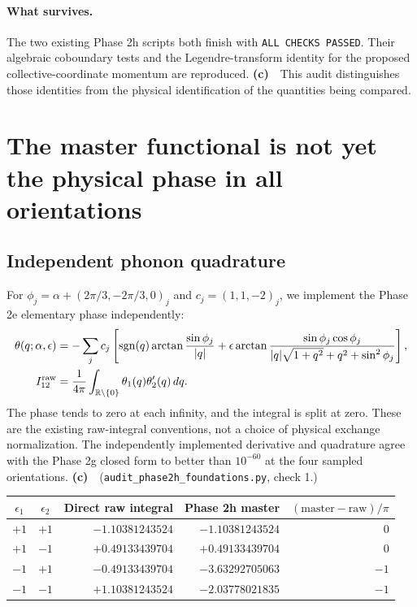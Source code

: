 \documentclass[11pt,a4paper]{article}
\newcommand{\Lc}{\textsf{\textbf{(c)}}\ }
\newcommand{\scr}{\texttt{audit\_\allowbreak phase2h\_\allowbreak foundations.py}}
\begin{document}
\paragraph{What survives.}
The two existing Phase 2h scripts both finish with
\texttt{ALL CHECKS PASSED}. Their algebraic coboundary tests and the
Legendre-transform identity for the proposed collective-coordinate momentum
are reproduced. \Lc\ This audit distinguishes those identities from the
physical identification of the quantities being compared.

\section{The master functional is not yet the physical phase in all orientations}
\subsection{Independent phonon quadrature}
For $\phi_j=\alpha+(2\pi/3,-2\pi/3,0)_j$ and $c_j=(1,1,-2)_j$, we implement
the Phase 2e elementary phase independently:
\begin{align*}
 \theta(q;\alpha,\epsilon)
 &=-\sum_j c_j\left[\operatorname{sgn}(q)\arctan\frac{\sin\phi_j}{|q|}
 +\epsilon\arctan\frac{\sin\phi_j\cos\phi_j}
 {|q|\sqrt{1+q^2}+q^2+\sin^2\phi_j}\right],\\
 I^{\rm raw}_{12}&=\frac1{4\pi}\int_{\mathbb R\setminus\{0\}}
             \theta_1(q)\theta'_2(q)\,dq.
\end{align*}
The phase tends to zero at each infinity, and the integral is split at zero.
These are the existing raw-integral conventions, not a choice of physical
exchange normalization. The independently implemented derivative and
quadrature agree with the Phase 2g closed form to better than $10^{-60}$ at
the four sampled orientations. \Lc\ (\scr, check 1.)

\begin{center}\small
\begin{tabular}{@{}ccrrr@{}}\toprule
$\epsilon_1$ & $\epsilon_2$ & Direct raw integral & Phase 2h master
 & $(\text{master}-\text{raw})/\pi$\\\midrule
$+1$ & $+1$ & $-1.10381243524$ & $-1.10381243524$ & $0$\\
$+1$ & $-1$ & $+0.49133439704$ & $+0.49133439704$ & $0$\\
$-1$ & $+1$ & $-0.49133439704$ & $-3.63292705063$ & $-1$\\
$-1$ & $-1$ & $+1.10381243524$ & $-2.03778021835$ & $-1$\\\bottomrule
\end{tabular}
\end{center}
\end{document}
